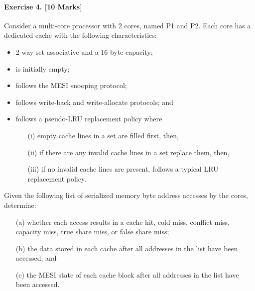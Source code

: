 \documentclass[12pt, a4paper]{article}
\begin{document}
\paragraph{Exercise 4. [10 Marks]}
Consider a multi-core processor with 2 cores, named P1 and P2.
Each core has a dedicated cache with the following characteristics:
\begin{itemize}
  \item 2-way set associative and a 16-byte capacity;
  \item is initially empty;
  \item follows the MESI snooping protocol;
  \item follows write-back and write-allocate protocols; and
  \item follows a pseudo-LRU replacement policy where
  \begin{enumerate}
    \item[(i)] empty cache lines in a set are filled first, then,
    \item[(ii)] if there are any invalid cache lines in a set replace them, then,
    \item[(iii)] if no invalid cache lines are present, follows a typical LRU replacement policy.
  \end{enumerate}
\end{itemize}
Given the following list of serialized memory byte address accesses by the cores, determine:
\begin{enumerate}
  \item[(a)] whether each access results in a cache hit, cold miss, conflict miss, capacity miss, true share miss, or false share miss;
  \item[(b)] the data stored in each cache after all addresses in the list have been accessed; and
  \item[(c)] the MESI state of each cache block after all addresses in the list have been accessed.
\end{enumerate}
 
\end{document}
